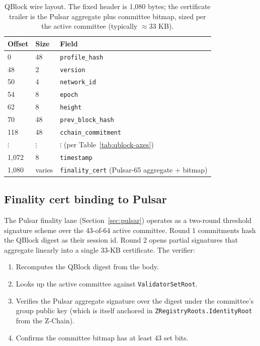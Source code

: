 \begin{table}[H]
\centering
\caption{QBlock wire layout. The fixed header is 1{,}080 bytes; the
certificate trailer is the Pulsar aggregate plus committee bitmap, sized
per the active committee (typically $\approx 33$ KB).}
\begin{tabular}{lll}
\toprule
Offset & Size & Field \\
\midrule
0       & 48 & \texttt{profile\_hash} \\
48      & 2  & \texttt{version} \\
50      & 4  & \texttt{network\_id} \\
54      & 8  & \texttt{epoch} \\
62      & 8  & \texttt{height} \\
70      & 48 & \texttt{prev\_block\_hash} \\
118     & 48 & \texttt{cchain\_commitment} \\
$\vdots$ & $\vdots$ & $\vdots$ (per Table~\ref{tab:qblock-axes}) \\
1{,}072 & 8  & \texttt{timestamp} \\
1{,}080 & varies & \texttt{finality\_cert} (Pulsar-65 aggregate + bitmap) \\
\bottomrule
\end{tabular}
\end{table}

\subsection{Finality cert binding to Pulsar}

The Pulsar finality lane (Section~\ref{sec:pulsar}) operates as a
two-round threshold signature scheme over the 43-of-64 active committee.
Round 1 commitments hash the QBlock digest as their session id. Round 2
opens partial signatures that aggregate linearly into a single 33-KB
certificate. The verifier:

\begin{enumerate}[leftmargin=2em,nosep]
  \item Recomputes the QBlock digest from the body.
  \item Looks up the active committee against
    \texttt{ValidatorSetRoot}.
  \item Verifies the Pulsar aggregate signature over the digest under the
    committee's group public key (which is itself anchored in
    \texttt{ZRegistryRoots.IdentityRoot} from the Z-Chain).
  \item Confirms the committee bitmap has at least 43 set bits.
\end{enumerate}

